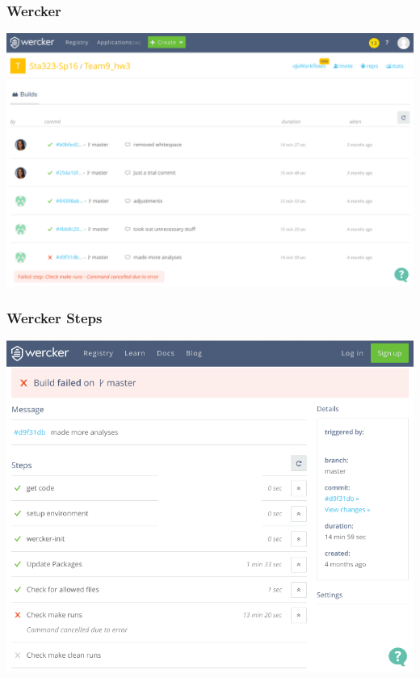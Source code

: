 \documentclass[12pt]{beamer}
\begin{document}


\begin{frame}
\frametitle{Wercker}

\includegraphics[width=\textwidth]{imgs/wercker_builds.png}
    
\end{frame}


\begin{frame}
\frametitle{Wercker Steps}

\includegraphics[width=\textwidth]{imgs/wercker_fail.png}

\end{frame}
\end{document}
